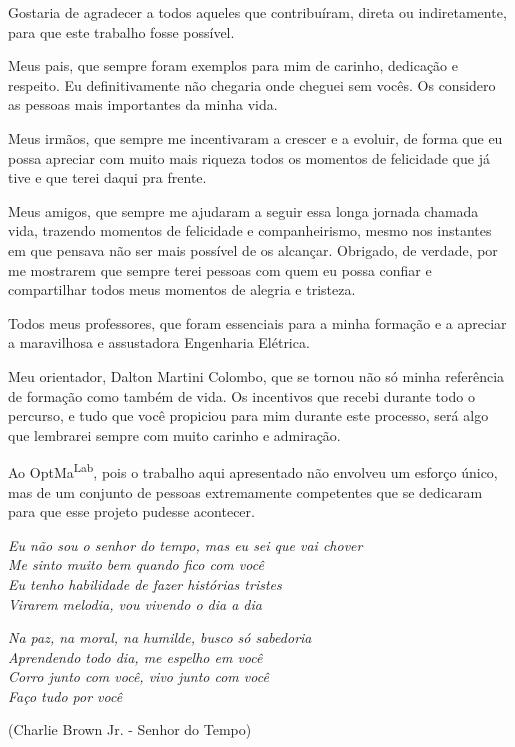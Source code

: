 \begin{agradecimentos}
Gostaria de agradecer a todos aqueles que contribuíram, direta ou indiretamente, para que este trabalho fosse possível.

Meus pais, que sempre foram exemplos para mim de carinho, dedicação e respeito. Eu definitivamente não chegaria onde cheguei sem vocês. Os considero as pessoas mais importantes da minha vida.

Meus irmãos, que sempre me incentivaram a crescer e a evoluir, de forma que eu possa apreciar com muito mais riqueza todos os momentos de felicidade que já tive e que terei daqui pra frente.

Meus amigos, que sempre me ajudaram a seguir essa longa jornada chamada vida, trazendo momentos de felicidade e companheirismo, mesmo nos instantes em que pensava não ser mais possível de os alcançar. Obrigado, de verdade, por me mostrarem que sempre terei pessoas com quem eu possa confiar e compartilhar todos meus momentos de alegria e tristeza.

Todos meus professores, que foram essenciais para a minha formação e a apreciar a maravilhosa e assustadora Engenharia Elétrica.

Meu orientador, Dalton Martini Colombo, que se tornou não só minha referência de formação como também de vida. Os incentivos que recebi durante todo o percurso, e tudo que você propiciou para mim durante este processo, será algo que lembrarei sempre com muito carinho e admiração.

Ao OptMa\textsuperscript{Lab}, pois o trabalho aqui apresentado não envolveu um esforço único, mas de um conjunto de pessoas extremamente competentes que se dedicaram para que esse projeto pudesse acontecer.

\end{agradecimentos}

\begin{epigrafe}
    \vspace*{\fill}
	\begin{flushright}
		\textit{Eu não sou o senhor do tempo, mas eu sei que vai chover\\
        Me sinto muito bem quando fico com você\\
        Eu tenho habilidade de fazer histórias tristes\\
        Virarem melodia, vou vivendo o dia a dia}
        
        \textit{
        Na paz, na moral, na humilde, busco só sabedoria\\
        Aprendendo todo dia, me espelho em você\\
        Corro junto com você, vivo junto com você\\
        Faço tudo por você}
        
        (Charlie Brown Jr. - Senhor do Tempo)
	\end{flushright}
\end{epigrafe}
